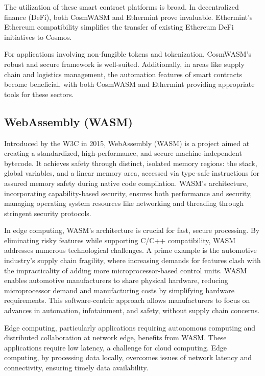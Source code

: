 The utilization of these smart contract platforms is broad. In decentralized finance (DeFi), both CosmWASM and Ethermint prove invaluable. Ethermint's Ethereum compatibility simplifies the transfer of existing Ethereum DeFi initiatives to Cosmos.

For applications involving non-fungible tokens and tokenization, CosmWASM's robust and secure framework is well-suited. Additionally, in areas like supply chain and logistics management, the automation features of smart contracts become beneficial, with both CosmWASM and Ethermint providing appropriate tools for these sectors.

\subsection{WebAssembly (WASM)}

Introduced by the W3C in 2015, WebAssembly (WASM) is a project aimed at creating a standardized, high-performance, and secure machine-independent bytecode. It achieves safety through distinct, isolated memory regions: the stack, global variables, and a linear memory area, accessed via type-safe instructions for assured memory safety during native code compilation. WASM's architecture, incorporating capability-based security, ensures both performance and security, managing operating system resources like networking and threading through stringent security protocols.

In edge computing, WASM's architecture is crucial for fast, secure processing. By eliminating risky features while supporting C/C++ compatibility, WASM addresses numerous technological challenges. A prime example is the automotive industry's supply chain fragility, where increasing demands for features clash with the impracticality of adding more microprocessor-based control units. WASM enables automotive manufacturers to share physical hardware, reducing microprocessor demand and manufacturing costs by simplifying hardware requirements. This software-centric approach allows manufacturers to focus on advances in automation, infotainment, and safety, without supply chain concerns.

Edge computing, particularly applications requiring autonomous computing and distributed collaboration at network edge, benefits from WASM. These applications require low latency, a challenge for cloud computing. Edge computing, by processing data locally, overcomes issues of network latency and connectivity, ensuring timely data availability.

